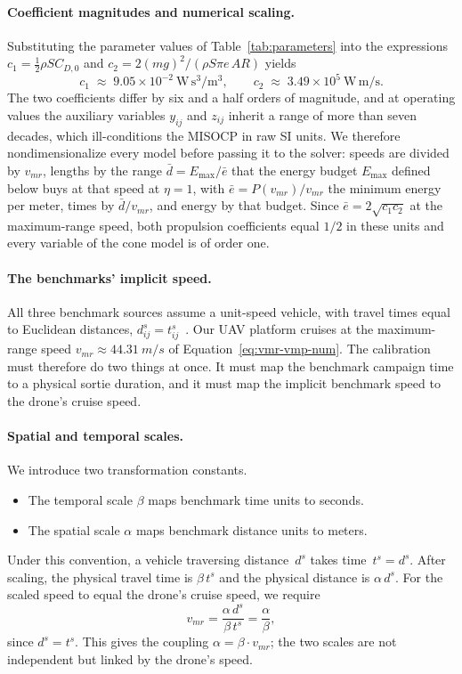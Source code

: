 \documentclass[11pt]{article}
\begin{document}
\paragraph{Coefficient magnitudes and numerical scaling.}
Substituting the parameter values of Table~\ref{tab:parameters} into the expressions $c_1 = \tfrac{1}{2}\rho S C_{D,0}$ and $c_2 = 2(mg)^2/(\rho S \pi e\, AR)$ yields
\begin{equation}\label{eq:ci-values}
c_1 \;\approx\; 9.05 \times 10^{-2}~\mathrm{W\,s^{3}/m^{3}}, \qquad
c_2 \;\approx\; 3.49 \times 10^{5}~\mathrm{W\,m/s}.
\end{equation}
The two coefficients differ by six and a half orders of magnitude, and at operating values the auxiliary variables $y_{ij}$ and $z_{ij}$ inherit a range of more than seven decades, which ill-conditions the MISOCP in raw SI units. We therefore nondimensionalize every model before passing it to the solver: speeds are divided by $v_{mr}$, lengths by the range $\bar{d} = E_{\max}/\bar{e}$ that the energy budget $E_{\max}$ defined below buys at that speed at $\eta = 1$, with $\bar{e} = P(v_{mr})/v_{mr}$ the minimum energy per meter, times by $\bar{d}/v_{mr}$, and energy by that budget. Since $\bar{e} = 2\sqrt{c_1 c_2}$ at the maximum-range speed, both propulsion coefficients equal $1/2$ in these units and every variable of the cone model is of order one.


\paragraph{The benchmarks' implicit speed.}
All three benchmark sources assume a unit-speed vehicle, with travel times equal to Euclidean distances, $d_{ij}^{s} = t_{ij}^{s}$~\cite{solomon1987algorithms}. Our UAV platform cruises at the maximum-range speed $v_{mr} \approx \SI{44.31}{m/s}$ of Equation~\eqref{eq:vmr-vmp-num}. The calibration must therefore do two things at once. It must map the benchmark campaign time to a physical sortie duration, and it must map the implicit benchmark speed to the drone's cruise speed.

\paragraph{Spatial and temporal scales.}
We introduce two transformation constants.
\begin{itemize}
    \item The temporal scale $\beta$ maps benchmark time units to seconds.
    \item The spatial scale $\alpha$ maps benchmark distance units to meters.
\end{itemize}
Under this convention, a vehicle traversing distance~$d^{s}$ takes time~$t^{s} = d^{s}$. After scaling, the physical travel time is $\beta\, t^{s}$ and the physical distance is $\alpha\, d^{s}$. For the scaled speed to equal the drone's cruise speed, we require
\[
    v_{mr} = \frac{\alpha\, d^{s}}{\beta\, t^{s}} = \frac{\alpha}{\beta},
\]
since $d^{s} = t^{s}$. This gives the coupling $\alpha = \beta \cdot v_{mr}$; the two scales are not independent but linked by the drone's speed.
\end{document}
